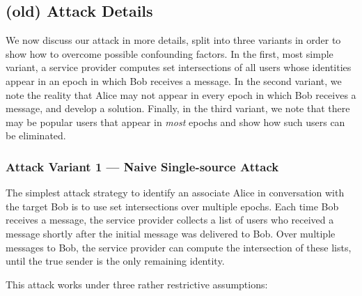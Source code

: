 %
%
%


\subsection{(old) Attack Details}

We now discuss our attack in more details, split into three variants in order to show how to overcome possible confounding factors.  In the first, most simple variant, a service provider computes set intersections of all users whose identities appear in an epoch in which Bob receives a message.  In the second variant, we note the reality that Alice may not appear in every epoch in which Bob receives a message, and develop a solution.  Finally, in the third variant, we note that there may be popular users that appear in {\em most} epochs and show how such users can be eliminated.


\subsubsection{Attack Variant 1 --- Naive Single-source Attack}
\label{sec:signal-attack1}
The simplest attack strategy to identify an associate Alice in
conversation with the target Bob is to use set intersections over
multiple epochs. 
Each time Bob receives a message, the
service provider collects a list of users who received a message shortly
after the initial message was delivered to Bob. Over multiple messages to Bob, the service
provider can compute the intersection of these lists, until the true sender is
the only remaining identity.

This attack works under three rather restrictive assumptions:

